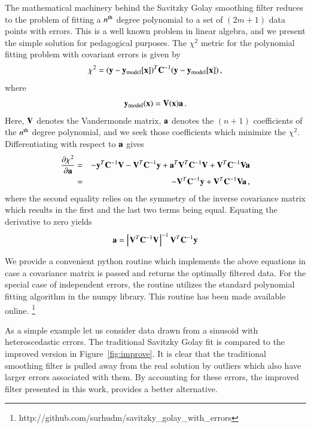 \documentclass[iop, apj, onecolumn]{emulateapj}
\begin{document}
The mathematical machinery behind the Savitzky Golay smoothing filter reduces to
the problem of fitting a $n^{\rm th}$ degree polynomial to a set of $(2m+1)$
data points with errors. This is a well known problem in linear algebra, and we
present the simple solution for pedagogical purposes. The $\chi^2$ metric for
the polynomial fitting problem with covariant errors is given by
\begin{equation}
        \chi^2 = ({\bf y}-{\bf y}_{\rm model}[{\bf x}])^T {\bf C}^{-1}
                ({\bf y}-{\bf y}_{\rm model}[{\bf x}])\,,
\end{equation}
where
\begin{equation} 
        {\bf y}_{\rm model}({\bf x}) = {\bf V}({\bf x}){\bf a}\,.
\end{equation}
Here, ${\bf V}$ denotes the Vandermonde matrix, ${\bf a}$ denotes the $(n+1)$
coefficients of the $n^{\rm th}$ degree polynomial, and we seek those
coefficients which minimize the $\chi^2$. Differentiating with respect to ${\bf
a}$ gives
\begin{eqnarray}
        \frac{\partial \chi^2}{\partial {\bf a}} &=& -{\bf y}^T {\bf C}^{-1} {\bf
        V} - {\bf V}^T {\bf C}^{-1} {\bf y} + {\bf a}^T {\bf
        V}^T {\bf C}^{-1} {\bf V} + {\bf V}^T {\bf C}^{-1} {\bf V} {\bf a} \\
        &=& - {\bf V}^T {\bf C}^{-1} {\bf y} + {\bf V}^T {\bf C}^{-1} {\bf V}
        {\bf a}\,,
\end{eqnarray}
where the second equality relies on the symmetry of the inverse covariance
matrix which results in the first and the last two terms being equal. Equating
the derivative to zero yields
\begin{equation}
        {\bf a} = \left[ {\bf V}^T {\bf C}^{-1} {\bf V}\right]^{-1} {\bf
        V}^T{\bf C}^{-1} {\bf y}
\end{equation}

We provide a convenient python routine which implements the above equations in
case a covariance matrix is passed and returns the optimally filtered data.  For
the special case of independent errors, the routine utilizes the standard
polynomial fitting algorithm in the numpy library. This routine has been made available online.
\footnote{http://github.com/surhudm/savitzky\_golay\_with\_errors}

As a simple example let us consider data drawn from a sinusoid with
heteroscedastic errors. The traditional Savitzky Golay fit is compared to the
improved version in Figure~\ref{fig:improve}. It is clear that the traditional
smoothing filter is pulled away from the real solution by outliers which also
have larger errors associated with them. By accounting for these errors, the
improved filter presented in this work, provides a better alternative.
\end{document}
